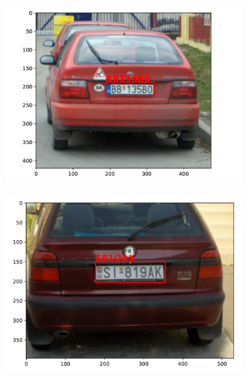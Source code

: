 \begin{figure}
    \begin{subfigure}{0.35\textwidth}
        \includegraphics[width=\textwidth]{abbildungen/prediction_01.pdf}
    \end{subfigure}
    \begin{subfigure}{0.35\textwidth}
        \includegraphics[width=\textwidth]{abbildungen/prediction_02.pdf}
    \end{subfigure}
    \begin{subfigure}{0.35\textwidth}

\end{subfigure}
\end{figure}
